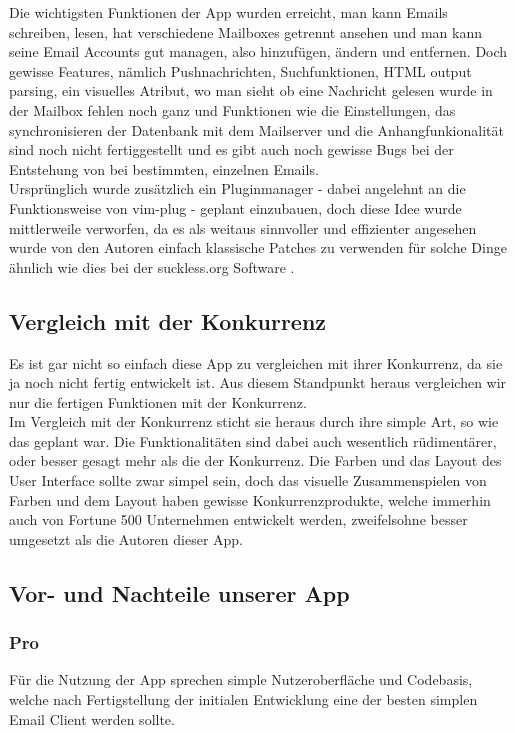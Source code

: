\documentclass[a4paper,11pt]{article}
\begin{document}
Die wichtigsten Funktionen der App wurden erreicht, man kann Emails schreiben, lesen, hat verschiedene Mailboxes getrennt ansehen und man kann seine Email Accounts gut managen, also hinzufügen, ändern und entfernen. Doch gewisse Features, nämlich Pushnachrichten, Suchfunktionen, HTML output parsing, ein visuelles Atribut, wo man sieht ob eine Nachricht gelesen wurde in der Mailbox fehlen noch ganz und Funktionen wie die Einstellungen, das synchronisieren der Datenbank mit dem Mailserver und die Anhangfunkionalität sind noch nicht fertiggestellt und es gibt auch noch gewisse Bugs bei der Entstehung von  \cite{edgecase} bei bestimmten, einzelnen Emails.\\

Ursprünglich wurde zusätzlich ein Pluginmanager - dabei angelehnt an die Funktionsweise von vim-plug\cite{plug} - geplant einzubauen, doch diese Idee wurde mittlerweile verworfen, da es als weitaus sinnvoller und effizienter angesehen wurde von den Autoren einfach klassische Patches zu verwenden für solche Dinge ähnlich wie dies bei der suckless.org Software \cite{dwm}.

\subsection{Vergleich mit der Konkurrenz}
Es ist gar nicht so einfach diese App zu vergleichen mit ihrer Konkurrenz, da sie ja noch nicht fertig entwickelt ist. Aus diesem Standpunkt heraus vergleichen wir nur die fertigen Funktionen mit der Konkurrenz.\\

Im Vergleich mit der Konkurrenz sticht sie heraus durch ihre simple Art, so wie das geplant war. Die Funktionalitäten sind dabei auch wesentlich rüdimentärer, oder besser gesagt mehr  als die der Konkurrenz. Die Farben und das Layout des User Interface sollte zwar simpel sein, doch das visuelle Zusammenspielen von Farben und dem Layout haben gewisse Konkurrenzprodukte, welche immerhin auch von Fortune 500 Unternehmen entwickelt werden, zweifelsohne besser umgesetzt als die Autoren dieser App.
\subsection{Vor- und Nachteile unserer App}
\subsubsection{Pro}
Für die Nutzung der App sprechen simple Nutzeroberfläche und Codebasis, welche nach Fertigstellung der initialen Entwicklung eine der besten simplen Email Client werden sollte.
\end{document}
